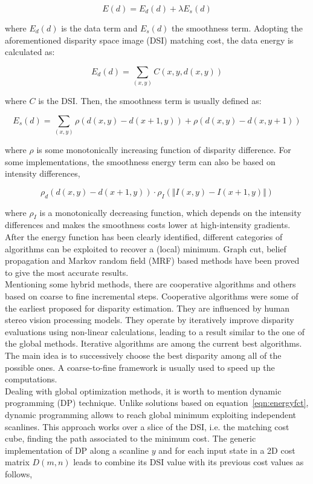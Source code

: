 \begin{equation}
\label{eqn:energyfct}
	E(d) = E_d(d) + \lambda E_s(d)
\end{equation}

where $E_d(d)$ is the data term and $E_s(d)$ the smoothness term.
Adopting the aforementioned disparity space image (DSI) matching cost, the data energy is calculated as:

\begin{equation}
\label{eqn:dataterm}
	E_d(d) = \sum_{(x,y)} C(x, y, d(x, y))
\end{equation}

where $C$ is the DSI.
Then, the smoothness term is usually defined as:

\begin{equation}
\label{eqn:smoothterm}
	E_s(d) = \sum_{(x,y)} \rho (d(x,y) - d(x + 1, y)) + \rho (d(x,y) - d(x, y + 1))
\end{equation}

where $\rho$ is some monotonically increasing function of disparity difference. 
For some implementations, the smoothness energy term can also be based on intensity differences,

\begin{equation}
\label{eqn:smoothtermintensity}
	\rho_d(d(x,y) - d(x + 1, y)) \cdot \rho_I(\Vert I(x,y) - I(x + 1,y) \Vert)
\end{equation}

where $\rho_I$ is a monotonically decreasing function, which depends on the intensity differences and makes the smoothness costs lower at high-intensity gradients.\\
After the energy function has been clearly identified, different categories of algorithms can be exploited to recover a (local) minimum.
Graph cut, belief propagation and Markov random field (MRF) based methods have been proved to give the most accurate results. \\
Mentioning some hybrid methods, there are cooperative algorithms and others based on coarse to fine incremental steps.
Cooperative algorithms were some of the earliest proposed for disparity estimation. 
They are influenced by human stereo vision processing models. 
They operate by iteratively improve disparity evaluations using non-linear calculations, leading to a result similar to the one of the global methods.
Iterative algorithms are among the current best algorithms.
The main idea is to successively choose the best disparity among all of the possible ones. 
A coarse-to-fine framework is usually used to speed up the computations.\\
Dealing with global optimization methods, it is worth to mention dynamic programming (DP) technique.
Unlike solutions based on equation~\ref{eqn:energyfct}, dynamic programming allows to reach global minimum exploiting independent scanlines.
This approach works over a slice of the DSI, i.e. the matching cost cube, finding the path associated to the minimum cost.
The generic implementation of DP along a scanline $y$ and for each input state in a 2D cost matrix $D(m, n)$ leads to combine its DSI value with its previous cost values as follows,

